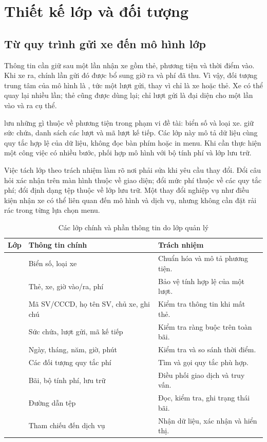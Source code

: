 \chapter{Thiết kế lớp và đối tượng}
\label{chap:design}

\section{Từ quy trình gửi xe đến mô hình lớp}
Thông tin cần giữ sau một lần nhận xe gồm thẻ, phương tiện và thời điểm vào. Khi xe ra, chính lần gửi đó được bổ sung giờ ra và phí đã thu. Vì vậy, đối tượng trung tâm của mô hình là , tức một lượt gửi, thay vì chỉ là xe hoặc thẻ. Xe có thể quay lại nhiều lần; thẻ cũng được dùng lại; chỉ lượt gửi là đại diện cho một lần vào và ra cụ thể.

 lưu những gì thuộc về phương tiện trong phạm vi đề tài: biển số và loại xe.  giữ sức chứa, danh sách các lượt và mã lượt kế tiếp. Các lớp này mô tả dữ liệu cùng quy tắc hợp lệ của dữ liệu, không đọc bàn phím hoặc in menu. Khi cần thực hiện một công việc có nhiều bước,  phối hợp mô hình với bộ tính phí và lớp lưu trữ.

Việc tách lớp theo trách nhiệm làm rõ nơi phải sửa khi yêu cầu thay đổi. Đổi câu hỏi xác nhận trên màn hình thuộc về giao diện; đổi mức phí thuộc về các quy tắc phí; đổi định dạng tệp thuộc về lớp lưu trữ. Một thay đổi nghiệp vụ như điều kiện nhận xe có thể liên quan đến mô hình và dịch vụ, nhưng không cần đặt rải rác trong từng lựa chọn menu.

\begin{table}[H]
\centering\small
\caption{Các lớp chính và phần thông tin do lớp quản lý}
\label{tab:classes}
\begin{tabularx}{\textwidth}{l Y Y}
\toprule
Lớp & Thông tin chính & Trách nhiệm\\
\midrule
{} & Biển số, loại xe & Chuẩn hóa và mô tả phương tiện.\\
 & Thẻ, xe, giờ vào/ra, phí & Bảo vệ tính hợp lệ của một lượt.\\
 & Mã SV/CCCD, họ tên SV, chủ xe, ghi chú & Kiểm tra thông tin khi mất thẻ.\\
 & Sức chứa, lượt gửi, mã kế tiếp & Kiểm tra ràng buộc trên toàn bãi.\\
 & Ngày, tháng, năm, giờ, phút & Kiểm tra và so sánh thời điểm.\\
 & Các đối tượng quy tắc phí & Tìm và gọi quy tắc phù hợp.\\
 & Bãi, bộ tính phí, lưu trữ & Điều phối giao dịch và truy vấn.\\
 & Đường dẫn tệp & Đọc, kiểm tra, ghi trạng thái bãi.\\
 & Tham chiếu đến dịch vụ & Nhận dữ liệu, xác nhận và hiển thị.\\
\bottomrule
\end{tabularx}
\end{table}

